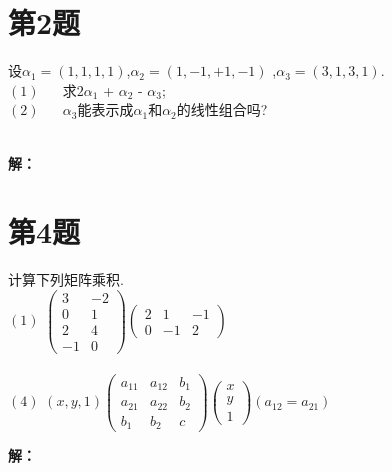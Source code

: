 \documentclass[a4paper, 12pt]{ctexart}
\begin{document}
\makeHomeworkTitle

\section{第2题}
\begin{exercise}[1]
    设$\alpha_{1} = \left (  1,1,1,1\right )$,$\alpha_{2} = \left (  1,-1,+1,-1\right )$ ,$\alpha_{3} = \left ( 3,1,3,1 \right )$.\\
    
    $(1)$ $\quad$ 求$2\alpha_{1}$ + $\alpha_{2}$ - $\alpha_{3}$;\\

    $(2)$ $\quad$ $\alpha_{3}$能表示成$\alpha_{1}$和$\alpha_{2}$的线性组合吗?
    
    
\end{exercise}~\\

\noindent\textbf{解：}


\section{第4题}
\begin{exercise}计算下列矩阵乘积.~\\


$(1)$ $\begin{pmatrix}
  3& -2\\
  0&  1\\
  2& 4\\
  -1& 0 
\end{pmatrix} 
\begin{pmatrix}
  2&  1& -1\\
  0&  -1& 2
\end{pmatrix} $~\\~\\

$(4)$
$\left ( x,y,1 \right ) 
\begin{pmatrix}
  a_{11}&  a_{12}& b_{1}\\
  a_{21}&  a_{22}& b_{2}\\
  b_{1}&  b_{2}& c
\end{pmatrix}
\begin{pmatrix}
  x\\
  y\\
  1
\end{pmatrix}
\left ( a_{12} = a_{21} \right ) $

\end{exercise}
\noindent\textbf{解：}
\end{document}

